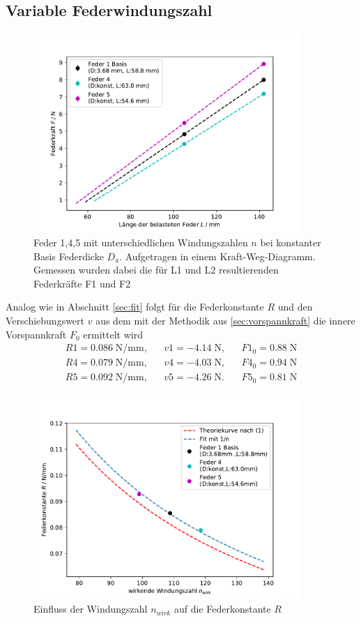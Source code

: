 \subsection{Variable Federwindungszahl}
\begin{figure}[H]
    \center
    \includegraphics[width=0.9\textwidth]{plots/n_kraftweg_dia.pdf}
    \caption{Feder 1,4,5 mit unterschiedlichen Windungszahlen $n$ bei konstanter Basis Federdicke $D_a$.
    Aufgetragen in einem Kraft-Weg-Diagramm. Gemessen wurden dabei die für L1
    und L2 resultierenden Federkräfte F1 und F2}
\end{figure}
Analog wie in Abschnitt \ref{sec:fit} folgt für die Federkonstante $R$
und den Verschiebungswert $v$ aus dem mit der Methodik aus \ref{sec:vorspannkraft}
die innere Vorspannkraft $F_0$ ermittelt wird
\begin{align*}
  R1= 0.086\;\si{\N\per\mm}, &&  v1= -4.14\;\si{\N}, && F1_0=0.88\;\si{\N}\\
  R4= 0.079\;\si{\N\per\mm}, &&  v4= -4.03\;\si{\N}, && F4_0=0.94\;\si{\N}\\
  R5= 0.092\;\si{\N\per\mm}, &&  v5= -4.26\;\si{\N}. && F5_0=0.81\;\si{\N}\\
\end{align*}

\begin{figure}[H]
  \center
  \includegraphics[width=0.9\textwidth]{plots/n_konstante_dia.pdf}
  \caption{Einfluss der Windungszahl $n_{wirk}$ auf die Federkonstante $R$}
\end{figure}

